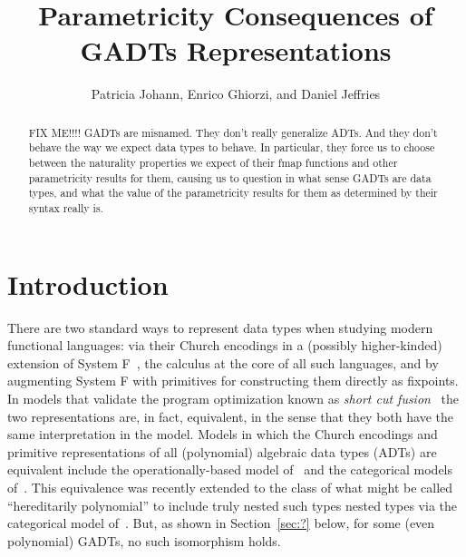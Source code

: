 \documentclass[acmsmall,screen,review,anonymous]{acmart}
\title[Parametricity Consequences of GADTs
  Representations]{Parametricity Consequences of GADTs
  Representations}
\author{Patricia Johann, Enrico Ghiorzi, and Daniel Jeffries}
\affiliation{ \institution{Appalachian State University}}
\theoremstyle{definition}
\begin{document}
\begin{abstract}
FIX ME!!!! GADTs are misnamed. They don't really generalize ADTs. And
they don't behave the way we expect data types to behave. In
particular, they force us to choose between the naturality properties
we expect of their fmap functions and other parametricity results for
them, causing us to question in what sense GADTs are data types, and
what the value of the parametricity results for them as determined by
their syntax really is.
\end{abstract}

\maketitle

\section{Introduction}

There are two standard ways to represent data types when studying
modern functional languages: via their Church encodings in a (possibly
higher-kinded) extension of System F~\cite{gir72}, the calculus at the
core of all such languages, and by augmenting System F
with primitives for constructing them directly as fixpoints.
In models that validate the program optimization known as {\em short
  cut fusion}~\cite{glp93} the two representations are, in fact,
equivalent, in the sense that they both have the same interpretation
in the model. Models in which the Church encodings and primitive
representations of all {\color{blue} (polynomial)} algebraic data
types (ADTs) are equivalent include the operationally-based model
of~\cite{pit98,pit00} and the categorical models
of~\cite{joh02,joh03}.
This equivalence was recently extended to the class of what might be
called ``hereditarily polynomial'' {\color{blue} to include truly
  nested such types} nested types via the categorical model
of~\cite{jgj21}. But, as shown in Section~\ref{sec:?} below, for some
{\color{blue} (even polynomial)} GADTs,
no such isomorphism holds.
\end{document}
